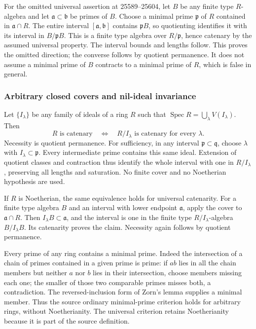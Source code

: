 For the omitted universal assertion at 25589--25604, let \(B\) be any finite type \(R\)-algebra and let \(\mathfrak a\subset\mathfrak b\) be primes of \(B\). Choose a minimal prime \(\mathfrak p\) of \(R\) contained in \(\mathfrak a\cap R\). The entire interval \([\mathfrak a,\mathfrak b]\) contains \(\mathfrak pB\), so quotienting identifies it with its interval in \(B/\mathfrak pB\). This is a finite type algebra over \(R/\mathfrak p\), hence catenary by the assumed universal property. The interval bounds and lengths follow. This proves the omitted direction; the converse follows by quotient permanence. It does not assume a minimal prime of \(B\) contracts to a minimal prime of \(R\), which is false in general.

\subsubsection{Arbitrary closed covers and nil-ideal invariance}\label{algebra-proof-020-arbitrary-closed-covers-and-nil-ideal-invariance}

Let \(\{I_\lambda\}\) be any family of ideals of a ring \(R\) such that \(\operatorname{Spec}R=\bigcup_\lambda V(I_\lambda)\). Then \[
 R\text{ is catenary}\quad\Longleftrightarrow\quad
 R/I_\lambda\text{ is catenary for every }\lambda.
\] Necessity is quotient permanence. For sufficiency, in any interval \(\mathfrak p\subset\mathfrak q\), choose \(\lambda\) with \(I_\lambda\subset
\mathfrak p\). Every intermediate prime contains this same ideal. Extension of quotient classes and contraction thus identify the whole interval with one in \(R/I_\lambda\), preserving all lengths and saturation. No finite cover and no Noetherian hypothesis are used.

If \(R\) is Noetherian, the same equivalence holds for universal catenarity. For a finite type algebra \(B\) and an interval with lower endpoint \(\mathfrak a\), apply the cover to \(\mathfrak a\cap R\). Then \(I_\lambda B\subset\mathfrak a\), and the interval is one in the finite type \(R/I_\lambda\)-algebra \(B/I_\lambda B\). Its catenarity proves the claim. Necessity again follows by quotient permanence.

Every prime of any ring contains a minimal prime. Indeed the intersection of a chain of primes contained in a given prime is prime: if \(ab\) lies in all the chain members but neither \(a\) nor \(b\) lies in their intersection, choose members missing each one; the smaller of those two comparable primes misses both, a contradiction. The reversed-inclusion form of Zorn's lemma supplies a minimal member. Thus the source ordinary minimal-prime criterion holds for arbitrary rings, without Noetherianity. The universal criterion retains Noetherianity because it is part of the source definition.

